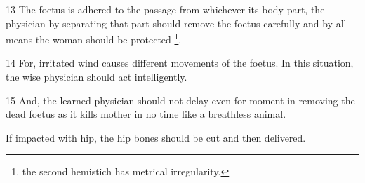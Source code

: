 \begin{translation}
\item[13]	The foetus is adhered to the passage from whichever its body part, the 
physician by separating that part should remove the foetus carefully and by all 
means the woman should be protected \footnote{the second hemistich has metrical irregularity.}.

\item[14]
For, irritated wind causes different movements of the foetus. In this situation, the 
wise physician should act intelligently. 

\item[15]	And, the learned physician should not delay even for moment in 
removing the dead foetus as it kills mother in no time like a breathless animal.  

If impacted with hip, the hip bones should be cut and then delivered.

   
\end{translation}

